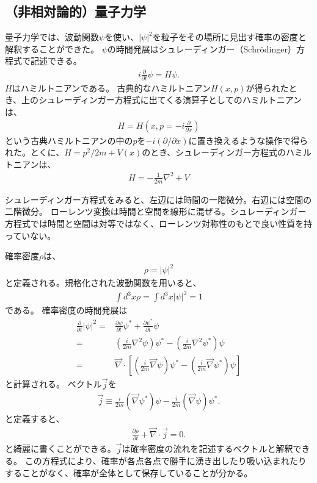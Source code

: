 \documentclass[10pt,a4paper]{jarticle}
\begin{document}
\subsection{（非相対論的）量子力学}
量子力学では、波動関数$\psi$を使い、$|\psi|^2$を粒子をその場所に見出す確率の密度と解釈することができた。
$\psi$の時間発展はシュレーディンガー（Schr\"odinger）方程式で記述できる。
\begin{align}
i\frac{\partial}{\partial t} \psi = H \psi.
\end{align}
$H$はハミルトニアンである。
古典的なハミルトニアン$H(x,p)$が得られたとき、上のシュレーディンガー方程式に出てくる演算子としてのハミルトニアンは、
\begin{align}
H = H\left( x, p= -i\frac{\partial}{\partial x} \right)
\end{align}
という古典ハミルトニアンの中の$p$を$-i(\partial/\partial x)$に置き換えるような操作で得られた。とくに、$H = p^2/2m + V(x)$のとき、シュレーディンガー方程式のハミルトニアンは、
\begin{align}
H = -\frac{1}{2m}\nabla^2 + V
\end{align}

シュレーディンガー方程式をみると、左辺には時間の一階微分。右辺には空間の二階微分。
ローレンツ変換は時間と空間を線形に混ぜる。シュレーディンガー方程式では時間と空間は対等ではなく、ローレンツ対称性のもとで良い性質を持っていない。


確率密度$\rho$は、
\begin{align}
\rho = |\psi|^2 \label{eq:probability density NR}
\end{align}
と定義される。規格化された波動関数を用いると、
\begin{align}
\int d^3x \rho = \int d^3x |\psi|^2 = 1
\end{align}
である。
確率密度の時間発展は
\begin{align}
\frac{\partial}{\partial t}|\psi|^2
=& \frac{\partial \psi}{\partial t} \psi^* + \frac{\partial \psi^*}{\partial t} \psi \nonumber\\
=& \left( \frac{i}{2m} \nabla^2 \psi \right) \psi^* - \left( \frac{i}{2m} \nabla^2 \psi^* \right) \psi \nonumber\\
=& \vec\nabla \cdot \left[ \left( \frac{i}{2m} \vec\nabla \psi \right) \psi^* - \left( \frac{i}{2m} \vec\nabla \psi^* \right) \psi \right]
\end{align}
と計算される。
ベクトル$\vec j$を
\begin{align}
\vec j \equiv \frac{i}{2m} (\vec\nabla\psi^*) \psi - \frac{i}{2m} (\vec\nabla\psi) \psi^*.
\end{align}
と定義すると、
\begin{align}
\frac{\partial\rho}{\partial t} + \vec \nabla \cdot \vec j = 0.
\end{align}
と綺麗に書くことができる。$\vec j$は確率密度の流れを記述するベクトルと解釈できる。
この方程式により、確率が各点各点で勝手に湧き出したり吸い込まれたりすることがなく、確率が全体として保存していることが分かる。
\end{document}
